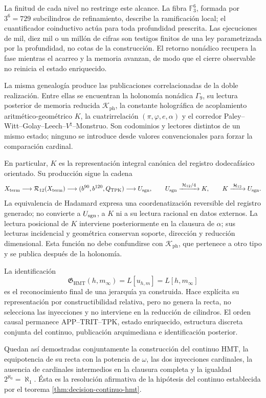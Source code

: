 La finitud de cada nivel no restringe este alcance. La fibra
\(\mathbb F_3^6\), formada por \(3^6=729\) subcilindros de refinamiento,
describe la ramificación local; el cuantificador coinductivo actúa para toda
profundidad prescrita. Las ejecuciones de mil, diez mil o un millón de cifras
son testigos finitos de una ley parametrizada por la profundidad, no cotas de
la construcción. El retorno nonádico recupera la fase mientras el acarreo y la
memoria avanzan, de modo que el cierre observable no reinicia el estado
enriquecido.

\clearpage
La misma genealogía produce las publicaciones correlacionadas de la doble
realización. Entre ellas se encuentran la holonomía nonádica
\(\Gamma_9\), su lectura posterior de memoria reducida
\(\mathcal K_{\mathrm{ph}}\), la constante holográfica de acoplamiento
aritmético-geométrico \(K\), la cuatrirrelación
\((\pi,\varphi,e,\alpha)\) y el corredor
Paley--Witt--Golay--Leech--\(V^\natural\)--Monstruo. Son codominios y
lectores distintos de un mismo estado; ninguno se introduce desde valores
convencionales para forzar la comparación cardinal.

En particular, \(K\) es la representación integral canónica del registro
dodecafásico orientado. Su producción sigue la cadena
\[
 X_{\rm term}\longrightarrow\mathcal R_{12}(X_{\rm term})
 \longrightarrow(b^{90},b^{120},Q_{\rm TPK})
 \longrightarrow U_{\rm sgn},
 \qquad
 U_{\rm sgn}\xrightarrow{\;\mathcal H_{12}/4\;}K,
 \qquad
 K\xrightarrow{\;\mathcal H_{12}\;}U_{\rm sgn}.
\]
La equivalencia de Hadamard expresa una coordenatización reversible del
registro generado; no convierte a \(U_{\rm sgn}\), a \(K\) ni a su lectura
racional en datos externos. La lectura posicional de \(K\) interviene
posteriormente en la clausura de \(\alpha\); sus lecturas incidencial y
geométrica conservan soporte, dirección y reducción dimensional. Esta función
no debe confundirse con \(\mathcal K_{\mathrm{ph}}\), que pertenece a otro
tipo y se publica después de la holonomía.

La identificación
\[
 \mathfrak G_{\mathrm{HMT}}(h,m_\infty)
 =L[u_{h,m}]=L[h,m_\infty]
\]
es el reconocimiento final de una jerarquía ya construida. Hace explícita su
representación por constructibilidad relativa, pero no genera la recta, no
selecciona las inyecciones y no interviene en la reducción de cilindros. El
orden causal permanece APP--TRIT--TPK, estado enriquecido, estructura discreta
conjunta del continuo, publicación arquimediana e identificación posterior.

Quedan así demostradas conjuntamente la construcción del continuo HMT, la
equipotencia de su recta con la potencia de \(\omega\), las dos inyecciones
cardinales, la ausencia de cardinales intermedios en la clausura completa y la
igualdad \(2^{\aleph_0}=\aleph_1\). Ésta es la resolución afirmativa de la
hipótesis del continuo establecida por el teorema
\ref{thm:decision-continuo-hmt}.
\endgroup
